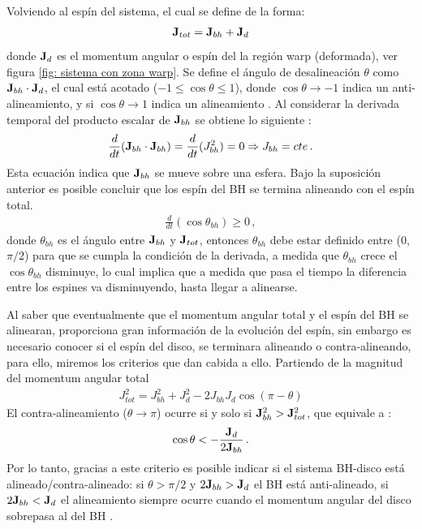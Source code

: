 Volviendo al espín del sistema, el cual se define de la forma:
\begin{align}
	{\bf{J}}_{tot}= {\bf{J}}_{bh}+{\bf{J}}_{d}
\end{align}
donde ${\bf{J}}_{d}$ es el momentum angular o espín del la región warp  (deformada), ver figura \ref{fig: sistema con zona warp}. Se define el ángulo de desalineación $\theta$ como  ${\bf{J}}_{bh}\cdot{\bf{J}}_{d}$, el cual está acotado ($-1\leq \cos\theta \leq 1$), donde $\cos \theta \to -1$ indica un anti-alineamiento, y si $\cos \theta \to 1$ indica un alineamiento \cite{king2005}. Al considerar la derivada temporal del producto escalar de  ${\bf{J}}_{bh}$ se obtiene lo siguiente \cite{king2005}:
%
\begin{align}
    \frac{d }{dt}({\bf{J}}_{bh}\cdot {\bf{J}}_{bh})=  \frac{d}{dt}(J_{bh}^{2})= 0 \Rightarrow J_{bh}=cte\,.
\end{align}
%
Esta ecuación indica que ${\bf{J}}_{bh}$ se mueve sobre una esfera. Bajo la suposición anterior es posible concluir que los espín del BH se termina alineando con el espín total. 
%
\begin{align}
    \frac{d}{dt}(\cos\theta_{bh})\geq 0\,,
\end{align}
%
donde $\theta_{bh}$ es el ángulo entre ${\bf{J}}_{bh}$ y ${\bf{J}}_{tot}$, entonces $\theta_{bh}$ debe estar definido entre (0,$\pi/2$) para que se cumpla la condición de la derivada, a medida que $\theta_{bh}$ crece el $\cos\theta_{bh}$ disminuye, lo cual implica que a medida que pasa el tiempo la diferencia entre los espines va disminuyendo, hasta llegar a alinearse.

Al saber que eventualmente que el momentum angular total y el espín del BH se alinearan, proporciona gran información de la evolución del espín, sin embargo es necesario conocer si el espín del disco, se terminara alineando o contra-alineando, para ello, miremos los criterios que dan cabida a ello. Partiendo de la magnitud del momentum angular total
%
\begin{align}
    J^{2}_{tot} = J^{2}_{bh}+J_{d}^{2} -2J_{bh}J_{d}\cos(\pi -\theta)
\end{align}
%
El contra-alineamiento ($\theta\to\pi$) ocurre si y solo si ${\bf{J}}_{bh}^{2}>{\bf{J}}_{tot}^{2}$, que equivale a \cite{king2005}:
%
\begin{align}
    \cos\theta < - \frac{{\bf{J}}_{d}}{2{\bf{J}}_{bh}}\,.   
\end{align}
%
Por lo tanto, gracias a este criterio es posible indicar si el sistema BH-disco está alineado/contra-alineado: si $\theta >\pi/2$ y $2{\bf{J}}_{bh}>{\bf{J}}_{d}$ el BH está anti-alineado, si  $2{\bf{J}}_{bh}<{\bf{J}}_{d}$ el alineamiento siempre ocurre cuando el momentum angular del disco sobrepasa al del BH \cite{king2005}.

